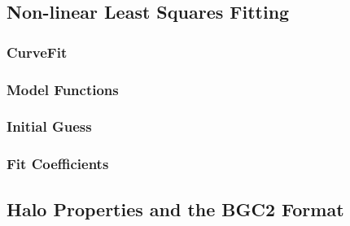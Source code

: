 \subsection{Non-linear Least Squares Fitting}
\label{subsec:fitting}



\subsubsection{CurveFit}
\label{subsubsec:curvefit}



\subsubsection{Model Functions}
\label{subsubsec:model_functions}



\subsubsection{Initial Guess}
\label{subsubsec:initial_guess}



\subsubsection{Fit Coefficients}
\label{subsubsec:fit_coefficients}




\subsection{Halo Properties and the BGC2 Format}
\label{subsec:halo_properties}



